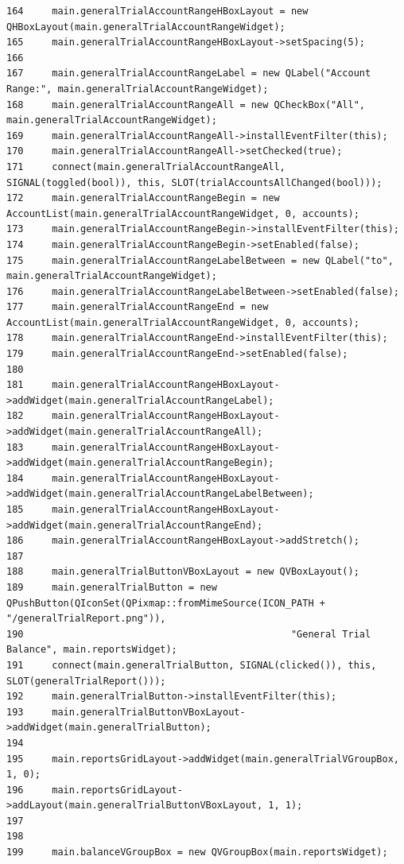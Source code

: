 \begin{verbatim}
164     main.generalTrialAccountRangeHBoxLayout = new QHBoxLayout(main.generalTrialAccountRangeWidget);
165     main.generalTrialAccountRangeHBoxLayout->setSpacing(5);
166     
167     main.generalTrialAccountRangeLabel = new QLabel("Account Range:", main.generalTrialAccountRangeWidget);
168     main.generalTrialAccountRangeAll = new QCheckBox("All", main.generalTrialAccountRangeWidget);
169     main.generalTrialAccountRangeAll->installEventFilter(this);
170     main.generalTrialAccountRangeAll->setChecked(true);
171     connect(main.generalTrialAccountRangeAll, SIGNAL(toggled(bool)), this, SLOT(trialAccountsAllChanged(bool)));
172     main.generalTrialAccountRangeBegin = new AccountList(main.generalTrialAccountRangeWidget, 0, accounts);
173     main.generalTrialAccountRangeBegin->installEventFilter(this);
174     main.generalTrialAccountRangeBegin->setEnabled(false);
175     main.generalTrialAccountRangeLabelBetween = new QLabel("to", main.generalTrialAccountRangeWidget);
176     main.generalTrialAccountRangeLabelBetween->setEnabled(false);
177     main.generalTrialAccountRangeEnd = new AccountList(main.generalTrialAccountRangeWidget, 0, accounts);
178     main.generalTrialAccountRangeEnd->installEventFilter(this);
179     main.generalTrialAccountRangeEnd->setEnabled(false);
180     
181     main.generalTrialAccountRangeHBoxLayout->addWidget(main.generalTrialAccountRangeLabel);
182     main.generalTrialAccountRangeHBoxLayout->addWidget(main.generalTrialAccountRangeAll);
183     main.generalTrialAccountRangeHBoxLayout->addWidget(main.generalTrialAccountRangeBegin);
184     main.generalTrialAccountRangeHBoxLayout->addWidget(main.generalTrialAccountRangeLabelBetween);
185     main.generalTrialAccountRangeHBoxLayout->addWidget(main.generalTrialAccountRangeEnd);
186     main.generalTrialAccountRangeHBoxLayout->addStretch();
187     
188     main.generalTrialButtonVBoxLayout = new QVBoxLayout();
189     main.generalTrialButton = new QPushButton(QIconSet(QPixmap::fromMimeSource(ICON_PATH + "/generalTrialReport.png")),
190                                               "General Trial Balance", main.reportsWidget);
191     connect(main.generalTrialButton, SIGNAL(clicked()), this, SLOT(generalTrialReport()));
192     main.generalTrialButton->installEventFilter(this);
193     main.generalTrialButtonVBoxLayout->addWidget(main.generalTrialButton);
194     
195     main.reportsGridLayout->addWidget(main.generalTrialVGroupBox, 1, 0);
196     main.reportsGridLayout->addLayout(main.generalTrialButtonVBoxLayout, 1, 1);
197     
198     
199     main.balanceVGroupBox = new QVGroupBox(main.reportsWidget);

\end{verbatim}
